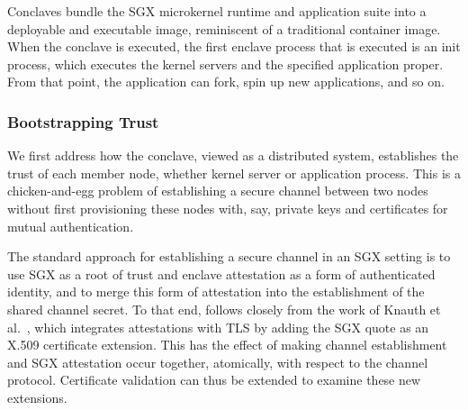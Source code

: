 Conclaves bundle the SGX microkernel runtime and application suite into a
deployable and executable image, reminiscent of a traditional container image.
%
When the conclave is executed, the first enclave process that is
executed is an init process, which executes the kernel servers and the
specified application proper.
%
From that point, the application can fork, spin up new applications,
and so on.


\subsubsection{Bootstrapping Trust} %


We first address how the conclave, viewed as a distributed system,
establishes the trust of each member node, whether kernel server or
application process.
%
This is a chicken-and-egg problem of establishing a secure channel
between two nodes without first provisioning these nodes with, say,
private keys and certificates for mutual authentication.
%



The standard approach for establishing a secure channel in an SGX setting is to use SGX
as a root of trust and enclave attestation as a form of authenticated identity,
and to merge this form of attestation into the establishment of the shared
channel secret.
%
To that end, \name follows closely from the work of Knauth et
al.~\cite{DBLP:journals/corr/abs-1801-05863}, which 
integrates attestations with TLS by adding the SGX quote as an X.509
certificate extension.
%
This has the effect of making channel establishment and SGX attestation
occur together,
atomically, with respect to the channel protocol.
%
Certificate validation can thus be extended to examine these new extensions.


